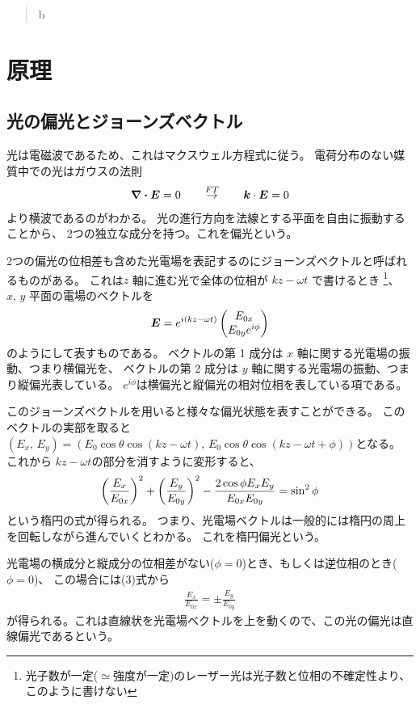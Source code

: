 \documentclass[9pt,dvipdfmx,a4paper]{jsarticle}
\begin{document}

\begin{abstract}
    b
\end{abstract}


\section{原理}
\subsection{光の偏光とジョーンズベクトル}
光は電磁波であるため、これはマクスウェル方程式に従う。
電荷分布のない媒質中での光はガウスの法則
\begin{align}
    \div{\vb*{E}} = 0 \overset{FT}{\qquad\rightarrow\qquad} \vb*{k}\cdot \vb*{E} = 0
\end{align}
より横波であるのがわかる。
光の進行方向を法線とする平面を自由に振動することから、
2つの独立な成分を持つ。これを偏光という。

2つの偏光の位相差も含めた光電場を表記するのにジョーンズベクトルと呼ばれるものがある。
これは\(z\) 軸に進む光で全体の位相が \(kz-\omega t\) で書けるとき
\footnote{光子数が一定(\(\simeq\)強度が一定)のレーザー光は光子数と位相の不確定性より、このように書けない}、
\(x,\,y\) 平面の電場のベクトルを
\begin{align}
    \vb*{E} = e^{i(kz-\omega t)}
    \begin{pmatrix}
        E_{0x}\\ E_{0y}e^{i\phi}
    \end{pmatrix}
\end{align}
のようにして表すものである。
ベクトルの第 1 成分は \(x\) 軸に関する光電場の振動、つまり横偏光を、
ベクトルの第 2 成分は \(y\) 軸に関する光電場の振動、つまり縦偏光表している。
\(e^{i\phi}\)は横偏光と縦偏光の相対位相を表している項である。

このジョーンズベクトルを用いると様々な偏光状態を表すことができる。
このベクトルの実部を取ると
\((E_x,\,E_y) = (E_0\cos\theta\cos(kz-\omega t),\,E_0\cos\theta\cos(kz-\omega t+\phi) )\)となる。
これから \(kz-\omega t\)の部分を消すように変形すると、
\begin{align}
    \qty(\frac{E_x}{E_{0x}})^2 + \qty(\frac{E_y}{E_{0y}})^2
    - \frac{2\cos\phi E_x E_y}{E_{0x}E_{0y}} = \sin^2\phi
\end{align}
という楕円の式が得られる。
つまり、光電場ベクトルは一般的には楕円の周上を回転しながら進んでいくとわかる。
これを楕円偏光という。

光電場の横成分と縦成分の位相差がない(\(\phi=0\))とき、もしくは逆位相のとき(\(\phi=0\))、
この場合には(3)式から
\begin{align}
    \frac{E_x}{E_{0x}} = \pm \frac{E_y}{E_{0y}}
\end{align}
が得られる。これは直線状を光電場ベクトルを上を動くので、この光の偏光は直線偏光であるという。
\end{document}
